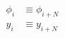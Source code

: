 \begin{equation}
 \begin{split}
  \phi_{i} & \equiv \phi_{i+N} \\
  y_{i}    & \equiv y_{i+N}
 \end{split}
\end{equation}

